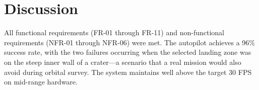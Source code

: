\section{Discussion}
All functional requirements (FR-01 through FR-11) and non-functional requirements (NFR-01 through NFR-06) were met. The autopilot achieves a 96\% success rate, with the two failures occurring when the selected landing zone was on the steep inner wall of a crater---a scenario that a real mission would also avoid during orbital survey. The system maintains well above the target 30 FPS on mid-range hardware.
